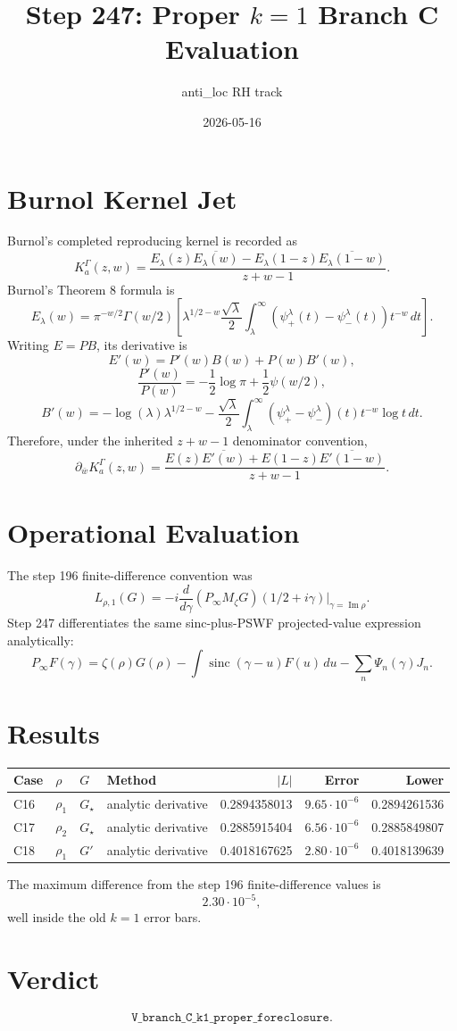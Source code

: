 \documentclass[11pt]{article}
\title{Step 247: Proper \(k=1\) Branch C Evaluation}
\author{anti\_loc RH track}
\date{2026-05-16}
\begin{document}
\maketitle

\section{Burnol Kernel Jet}

Burnol's completed reproducing kernel is recorded as
\[
K_a^\Gamma(z,w)=
\frac{E_\lambda(z)\overline{E_\lambda(w)}
-E_\lambda(1-z)\overline{E_\lambda(1-w)}}{z+w-1}.
\]
Burnol's Theorem 8 formula is
\[
E_\lambda(w)=\pi^{-w/2}\Gamma(w/2)
\left[
\lambda^{1/2-w}
\frac{\sqrt{\lambda}}2
\int_\lambda^\infty (\psi_+^\lambda(t)-\psi_-^\lambda(t))t^{-w}\,dt
\right].
\]
Writing \(E=P B\), its derivative is
\[
E'(w)=P'(w)B(w)+P(w)B'(w),
\]
\[
\frac{P'(w)}{P(w)}=-\frac12\log\pi+\frac12\psi(w/2),
\]
\[
B'(w)=-\log(\lambda)\lambda^{1/2-w}
-\frac{\sqrt\lambda}{2}
\int_\lambda^\infty
(\psi_+^\lambda-\psi_-^\lambda)(t)t^{-w}\log t\,dt.
\]
Therefore, under the inherited \(z+w-1\) denominator convention,
\[
\partial_{\bar w}K_a^\Gamma(z,w)
=
\frac{
E(z)\overline{E'(w)}
+E(1-z)\overline{E'(1-w)}
}{z+w-1}.
\]

\section{Operational Evaluation}

The step 196 finite-difference convention was
\[
L_{\rho,1}(G)
=-i\frac{d}{d\gamma}
\left(P_\infty M_\zeta G\right)(1/2+i\gamma)
\bigg|_{\gamma=\operatorname{Im}\rho}.
\]
Step 247 differentiates the same sinc-plus-PSWF projected-value expression analytically:
\[
P_\infty F(\gamma)
=\zeta(\rho)G(\rho)
-\int \operatorname{sinc}(\gamma-u)F(u)\,du
-\sum_n \Psi_n(\gamma)J_n.
\]

\section{Results}

\begin{center}
\begin{tabular}{llllrrr}
\toprule
Case & \(\rho\) & \(G\) & Method & \(|L|\) & Error & Lower\\
\midrule
C16 & \(\rho_1\) & \(G_\star\) & analytic derivative & 0.2894358013 & \(9.65\cdot10^{-6}\) & 0.2894261536\\
C17 & \(\rho_2\) & \(G_\star\) & analytic derivative & 0.2885915404 & \(6.56\cdot10^{-6}\) & 0.2885849807\\
C18 & \(\rho_1\) & \(G'\) & analytic derivative & 0.4018167625 & \(2.80\cdot10^{-6}\) & 0.4018139639\\
\bottomrule
\end{tabular}
\end{center}

The maximum difference from the step 196 finite-difference values is
\[
2.30\cdot 10^{-5},
\]
well inside the old \(k=1\) error bars.

\section{Verdict}

\[
\texttt{V\_branch\_C\_k1\_proper\_foreclosure}.
\]
\end{document}
